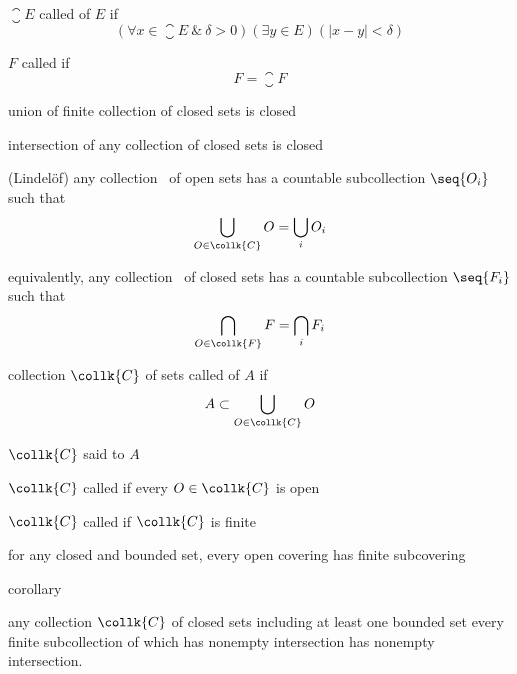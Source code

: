 \documentclass[17pt,landscape]{foils}
\newcommand\coll{\collk{C}}
\begin{document}
{	\vitem $\closure{E}$ called  of $E$ if
	\[
		(\forall x \in \closure{E} \ \&\ \delta>0)(\exists y\in E)(|x-y|<\delta)
	\]

	\vitem $F$ called  if
	\[
		F = \closure{F}
	\]
	\bit
		\item union of finite collection of closed sets is closed
		\item intersection of any collection of closed sets is closed
	\eit
\eit



\bit
	\item {}%

	\vitem (Lindel\"{o}f) any collection \coll\ of open sets has a countable subcollection $\seq{O_i}$ such that
	\[
		\bigcup_{O\in\coll} O = \bigcup_{i} O_i
	\]
	\bit
		\item equivalently,
			any collection \ of closed sets has a countable subcollection $\seq{F_i}$ such that
		\[
			\bigcap_{O\in\collk{F}} F = \bigcap_{i} F_i
		\]
	\eit
\eit



\bit
	\item collection $\coll$ of sets called  of $A$ if
		\[
			A \subset \bigcup_{O\in\coll} O
		\]
	\bit
		\item $\coll$ said to  $A$
		\item $\coll$ called  if every $O\in\coll$ is open
		\item $\coll$ called  if $\coll$ is finite
	\eit

	\vitem {}
		for any closed and bounded set, every open covering has finite subcovering

	\vitem corollary
	\bit
		\item any collection $\coll$ of closed sets including at least one bounded set every finite subcollection of which has nonempty intersection
		has nonempty intersection.

}
\end{document}
